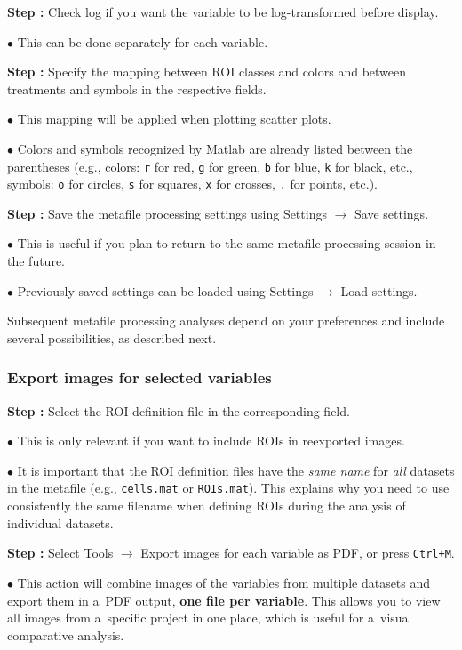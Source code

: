\documentclass[a4paper, 11pt]{article}
\newcommand{\ttt}[1]{\texttt{#1}}
\newcommand{\lans}[1]{{\color{magenta}#1}}
\newcommand{\lanscb}[1]{{\color{darkgreen}#1}}
\newcommand{\lanstf}[1]{{\color{cyan}#1}}
\newcommand\ra{\rightarrow}
\newcounter{step}
\newcommand\s{\addtocounter{step}{1}\noindent\textbf{Step \thestep:}{ }}
\newcommand\bul{\noindent$\bullet${ }}
\newcommand\bb[1]{\textbf{#1}}
\begin{document}
\s Check \lanscb{log} if you want the variable to be log-transformed before display.

\bul This can be done separately for each variable.

\s Specify the mapping between ROI classes and \lanstf{colors} and between treatments and \lanstf{symbols} in the respective fields. 

\bul This mapping will be applied when plotting scatter plots.

\bul Colors and symbols recognized by Matlab are already listed between the parentheses (e.g., colors: \ttt{r} for red, \ttt{g} for green, \ttt{b} for blue, \ttt{k} for black, etc., symbols: \ttt{o} for circles, \ttt{s} for squares, \ttt{x} for crosses, \ttt{.} for points, etc.).

\s Save the metafile processing settings using \lans{Settings} $\ra$ \lans{Save settings}.

\bul This is useful if you plan to return to the same metafile processing session in the future.

\bul Previously saved settings can be loaded using \lans{Settings} $\ra$ \lans{Load settings}.

Subsequent metafile processing analyses depend on your preferences and include several possibilities, as described next. 

\subsubsection{Export images for selected variables}
\label{sec:621}
\setcounter{step}{0}

\s Select the \lanstf{ROI definition file} in the corresponding field.

\bul This is only relevant if you want to include ROIs in reexported images.

\bul It is important that the ROI definition files have the \emph{same name} for \emph{all} datasets in the metafile (e.g., \ttt{cells.mat} or \ttt{ROIs.mat}). This explains why you need to use consistently the same filename when defining ROIs during the analysis of individual datasets.

\s Select \lans{Tools} $\ra$ \lans{Export images for each variable as PDF}, or press \ttt{Ctrl+M}. 

\bul This action will combine images of the variables from multiple datasets and export them in a~PDF output, \bb{one file per variable}. This allows you to view all images from a~specific project in one place, which is useful for a~visual comparative analysis.
\end{document}
